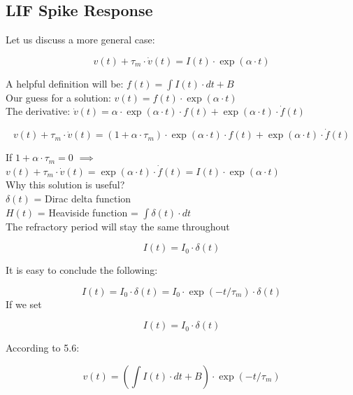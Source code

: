 \subsection{LIF Spike Response}

Let us discuss a more general case:

\begin{equation}
    v(t) + \tau_m \cdot \dot{v}(t) = I(t) \cdot \exp(\alpha \cdot t)
\end{equation}
    
A helpful definition will be: \(f(t) = \int I(t) \cdot dt + B\) \\
Our guess for a solution: \(v(t) = f(t) \cdot \exp(\alpha \cdot t)\) \\
The derivative: \(\dot{v}(t) = \alpha \cdot \exp(\alpha \cdot t) \cdot f(t) + \exp(\alpha \cdot t) \cdot \dot{f}(t)\)
    
\begin{equation}
    v(t) + \tau_m \cdot \dot{v}(t) = (1 + \alpha \cdot \tau_m) \cdot \exp(\alpha \cdot t) \cdot f(t) + \exp(\alpha \cdot t) \cdot \dot{f}(t)
\end{equation}
    
If \(1 + \alpha \cdot \tau_m = 0\) \(\implies\) \(v(t) + \tau_m \cdot \dot{v}(t) = \exp(\alpha \cdot t) \cdot \dot{f}(t) = I(t) \cdot \exp(\alpha \cdot t)\) \\


Why this solution is useful? \\
\(\delta(t)\) = Dirac delta function \\
\(H(t)\) = Heaviside function = \(\int \delta(t) \cdot dt\) \\
The refractory period will stay the same throughout  

\begin{equation}
	I(t) = I_0 \cdot \delta(t)
\end{equation}

It is easy to conclude the following: 

\begin{equation}
	I(t) = I_0 \cdot \delta(t) = I_0 \cdot \exp(-t/\tau_m) \cdot \delta(t)
\end{equation}
If we set 

\begin{equation}
	I(t) = I_0 \cdot \delta(t)
\end{equation}

According to 5.6:

\begin{equation}
	v(t) = (\int I(t) \cdot dt + B) \cdot \exp(-t/\tau_m)
\end{equation}

